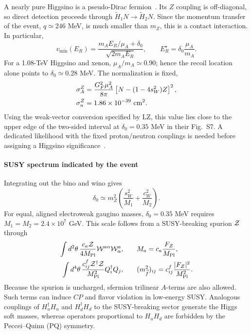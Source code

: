 \documentclass[superscriptaddress,aps,preprintnumbers,amsmath,amssymb,prd,nofootinbib,reprint]{revtex4-1}
\newcommand{\mpl}{M_{\rm Pl}}
\def\WY#1{#1}
\begin{document}
A nearly pure Higgsino is a pseudo-Dirac
fermion~\cite{Nagata:2014wma,Graham:2024syw}.  Its $Z$ coupling is
off-diagonal, so direct detection proceeds through
$\widetilde H_1 N\to\widetilde H_2 N$.  Since the momentum transfer of the
event, $q\simeq246$ MeV, is much smaller than $m_Z$, this is a contact
interaction. 
 In particular,
\begin{equation}
 v_{\min}(E_R)=\frac{m_AE_R/\mu_A+\delta_0}
 {\sqrt{2m_AE_R}},\qquad
 E_R^\star=\delta_0\frac{\mu_A}{m_A}.
\end{equation}
For a 1.08-TeV Higgsino and xenon, $\mu_A/m_A\simeq0.90$; hence the recoil
location alone points to $\delta_0\simeq0.28$ MeV.  The normalization is fixed,
\begin{align}
 \sigma_A^Z&=\frac{G_F^2\mu_A^2}{8\pi}
 \left[N-(1-4s_W^2)Z\right]^2,\\
 \sigma_n^Z&=1.86\times10^{-39}\ {\rm cm^2}.
\end{align}
Using the weak-vector conversion specified by LZ, this value lies close to the
upper edge of the two-sided interval at $\delta_0=0.35$ MeV in their
\WY{Fig.~S7}.  A dedicated likelihood with the fixed proton/neutron couplings is
needed before assigning a Higgsino significance~\cite{LZ:2026highE}.

\paragraph{\WY{SUSY spectrum indicated by the event}}
Integrating out the bino and wino gives~\cite{Nagata:2014wma}
\begin{equation}
 \delta_0\simeq m_Z^2\left(\frac{s_W^2}{M_1}+\frac{c_W^2}{M_2}\right).
 \label{eq:splitting}
\end{equation}
For equal, aligned electroweak gaugino masses, $\delta_0=0.35$ MeV requires
$M_1=M_2=2.4\times10^7$ GeV.  This scale follows from a SUSY-breaking spurion
${\cal Z}$ through~\cite{Martin:1997ns}
\begin{align}
 \int d^2\theta\,\frac{c_a{\cal Z}}{4\mpl}{\cal W}^{a\alpha}{\cal W}^a_\alpha,
 &\qquad M_a=c_a\frac{F_{\cal Z}}{\mpl},\\
 \int d^4\theta\,\frac{c^f_{ij}{\cal Z}^\dagger{\cal Z}}{\mpl^2}
 Q_i^\dagger Q_j,
 &\qquad (m_{\widetilde f}^2)_{ij}=c^f_{ij}
 \frac{|F_{\cal Z}|^2}{\mpl^2}.
\end{align}
\WY{Because the spurion is
uncharged, sfermion trilinear $A$-terms are also allowed. Such terms can induce
$CP$ and flavor violation in low-energy SUSY}.
\WY{Analogous couplings of $H_u^\dagger H_u$ and $H_d^\dagger H_d$ to the
SUSY-breaking sector generate the Higgs soft masses, whereas operators
proportional to $H_uH_d$ are forbidden by the Peccei--Quinn (PQ) symmetry.}
\end{document}
